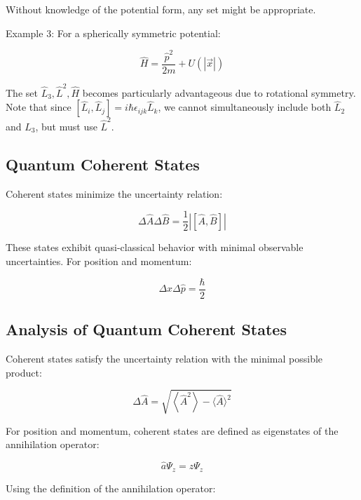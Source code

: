 \documentclass[italian]{HKNdocument}
\begin{document}
Without knowledge of the potential form, any set might be appropriate.

Example 3: For a spherically symmetric potential:

\begin{equation}
\hat{H}=\frac{\hat{p}^{2}}{2 m}+U(|\vec{x}|) \label{eq:7.42}
\end{equation}

The set $\hat{L}_{3}, \hat{L}^{2}, \hat{H}$ becomes particularly advantageous due to rotational symmetry. Note that since $\left[\hat{L}_{i}, \hat{L}_{j}\right]=i \hbar \epsilon_{i j k} \hat{L}_{k}$, we cannot simultaneously include both $\hat{L}_{2}$ and $\hat{L}_{3}$, but must use $\hat{L}^{2}$.

\subsection{Quantum Coherent States}
Coherent states minimize the uncertainty relation:

\begin{equation}
\Delta \hat{A} \Delta \hat{B}=\frac{1}{2}|[\hat{A}, \hat{B}]| \label{eq:7.43}
\end{equation}

These states exhibit quasi-classical behavior with minimal observable uncertainties. For position and momentum:

\begin{equation}
\Delta x \Delta \hat{p}=\frac{\hbar}{2} \label{eq:7.44}
\end{equation}


\subsection{Analysis of Quantum Coherent States}
Coherent states satisfy the uncertainty relation with the minimal possible product:

\begin{equation}
\Delta \hat{A}=\sqrt{\left\langle\hat{A}^{2}\right\rangle-\langle\hat{A}\rangle^{2}} \label{eq:7.45}
\end{equation}

For position and momentum, coherent states are defined as eigenstates of the annihilation operator:

\begin{equation}
\hat{a} \Psi_{z}=z \Psi_{z} \label{eq:7.46}
\end{equation}

Using the definition of the annihilation operator:
\end{document}
